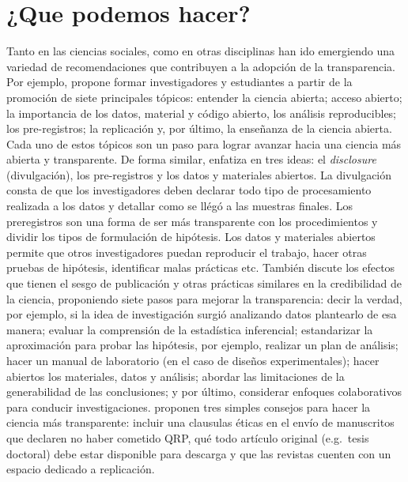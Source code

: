 \documentclass[
]{book}
\begin{document}
\hypertarget{que-podemos-hacer}{%
\section{¿Que podemos hacer?}\label{que-podemos-hacer}}

Tanto en las ciencias sociales, como en otras disciplinas han ido emergiendo una variedad de recomendaciones que contribuyen a la adopción de la transparencia. Por ejemplo, \citet{cruwell_Easy_2018} propone formar investigadores y estudiantes a partir de la promoción de siete principales tópicos: entender la ciencia abierta; acceso abierto; la importancia de los datos, material y código abierto, los análisis reproducibles; los pre-registros; la replicación y, por último, la enseñanza de la ciencia abierta. Cada uno de estos tópicos son un paso para lograr avanzar hacia una ciencia más abierta y transparente. De forma similar, \citet{miguel_Promoting_2014} enfatiza en tres ideas: el \emph{disclosure} (divulgación), los pre-registros y los datos y materiales abiertos. La divulgación consta de que los investigadores deben declarar todo tipo de procesamiento realizada a los datos y detallar como se llégó a las muestras finales. Los preregistros son una forma de ser más transparente con los procedimientos y dividir los tipos de formulación de hipótesis. Los datos y materiales abiertos permite que otros investigadores puedan reproducir el trabajo, hacer otras pruebas de hipótesis, identificar malas prácticas etc. También \citet{lindsay_Seven_2020} discute los efectos que tienen el sesgo de publicación y otras prácticas similares en la credibilidad de la ciencia, proponiendo siete pasos para mejorar la transparencia: decir la verdad, por ejemplo, si la idea de investigación surgió analizando datos plantearlo de esa manera; evaluar la comprensión de la estadística inferencial; estandarizar la aproximación para probar las hipótesis, por ejemplo, realizar un plan de análisis; hacer un manual de laboratorio (en el caso de diseños experimentales); hacer abiertos los materiales, datos y análisis; abordar las limitaciones de la generabilidad de las conclusiones; y por último, considerar enfoques colaborativos para conducir investigaciones. \citet{oboyle_Chrysalis_2017} proponen tres simples consejos para hacer la ciencia más transparente: incluir una clausulas éticas en el envío de manuscritos que declaren no haber cometido QRP, qué todo artículo original (e.g.~tesis doctoral) debe estar disponible para descarga y que las revistas cuenten con un espacio dedicado a replicación.
\end{document}
